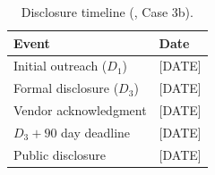 \begin{table}[h]
\centering
\caption{Disclosure timeline (\DEPLOYEDAPP{}, Case 3b).}
\label{tab:disclosure-timeline-3b}
\begin{tabular}{ll}
\toprule
Event & Date \\
\midrule
Initial outreach ($D_1$) & [DATE] \\
Formal disclosure ($D_3$) & [DATE] \\
Vendor acknowledgment & [DATE] \\
$D_3 + 90$ day deadline & [DATE] \\
Public disclosure & [DATE] \\
\bottomrule
\end{tabular}
\end{table}
